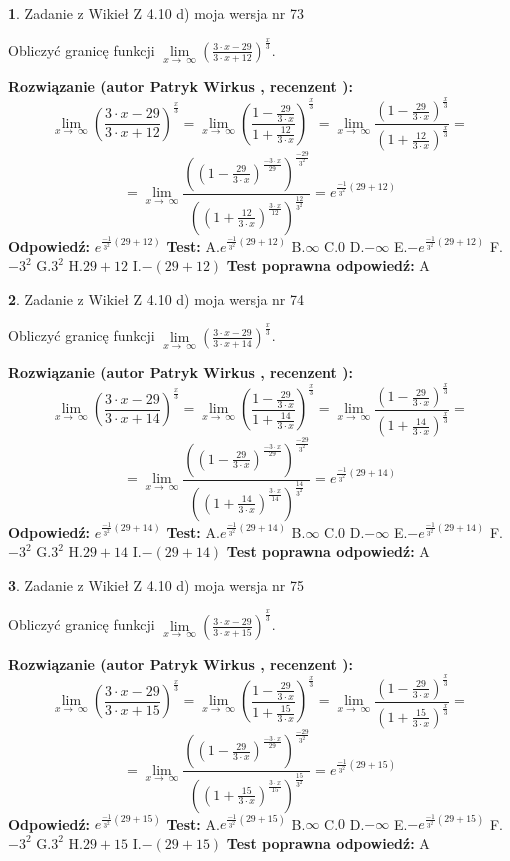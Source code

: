 \documentclass[12pt, a4paper]{article}
\theoremstyle{definition} %
\newtheorem{zad}{}
\newcommand{\zadStart}[1]{\begin{zad}#1\newline}
\newcommand{\zadStop}{\end{zad}}
\newcommand{\rozwStart}[2]{\noindent \textbf{Rozwiązanie (autor #1 , recenzent #2): }\newline}
\newcommand{\rozwStop}{\newline}
\newcommand{\odpStart}{\noindent \textbf{Odpowiedź:}\newline}
\newcommand{\odpStop}{\newline}
\newcommand{\testStart}{\noindent \textbf{Test:}\newline}
\newcommand{\testStop}{\newline}
\newcommand{\kluczStart}{\noindent \textbf{Test poprawna odpowiedź:}\newline}
\newcommand{\kluczStop}{\newline}
\begin{document}
\zadStart{Zadanie z Wikieł Z 4.10 d) moja wersja nr 73}


Obliczyć granicę funkcji  $\lim\limits_{x\to\ \infty}(\frac{3\cdot x-29}{3\cdot x+12})^{\frac{x}{3}}$.
\zadStop
\rozwStart{Patryk Wirkus}{}
$$\lim\limits_{x\to\ \infty}(\frac{3\cdot x-29}{3\cdot x+12})^{\frac{x}{3}} = \lim\limits_{x\to\ \infty}(\frac{1-\frac{29}{3\cdot x}}{1+\frac{12}{3\cdot x}})^{\frac{x}{3}}=\lim\limits_{x\to\ \infty}\frac{(1-\frac{29}{3\cdot x})^{\frac{x}{3}}}{(1+\frac{12}{3\cdot x})^{\frac{x}{3}}}=$$
$$=\lim\limits_{x\to\ \infty}\frac{((1-\frac{29}{3\cdot x})^{\frac{-3\cdot x}{29}})^{\frac{-29}{3^{2}}}}{((1+\frac{12}{3\cdot x})^{\frac{3\cdot x}{12}})^{\frac{12}{3^{2}}}}=e^{\frac{-1}{3^{2}}(29+12)}$$
\rozwStop
\odpStart
$e^{\frac{-1}{3^{2}}(29+12)}$
\odpStop
\testStart
A.$e^{\frac{-1}{3^{2}}(29+12)}$ B.$\infty$ C.$0$ D.$-\infty$ E.$-e^{\frac{-1}{3^{2}}(29+12)}$
F.$-3^{2}$ G.$3^{2}$
H.$29+12$
I.$-(29+12)$
\testStop
\kluczStart
A
\kluczStop



\zadStart{Zadanie z Wikieł Z 4.10 d) moja wersja nr 74}


Obliczyć granicę funkcji  $\lim\limits_{x\to\ \infty}(\frac{3\cdot x-29}{3\cdot x+14})^{\frac{x}{3}}$.
\zadStop
\rozwStart{Patryk Wirkus}{}
$$\lim\limits_{x\to\ \infty}(\frac{3\cdot x-29}{3\cdot x+14})^{\frac{x}{3}} = \lim\limits_{x\to\ \infty}(\frac{1-\frac{29}{3\cdot x}}{1+\frac{14}{3\cdot x}})^{\frac{x}{3}}=\lim\limits_{x\to\ \infty}\frac{(1-\frac{29}{3\cdot x})^{\frac{x}{3}}}{(1+\frac{14}{3\cdot x})^{\frac{x}{3}}}=$$
$$=\lim\limits_{x\to\ \infty}\frac{((1-\frac{29}{3\cdot x})^{\frac{-3\cdot x}{29}})^{\frac{-29}{3^{2}}}}{((1+\frac{14}{3\cdot x})^{\frac{3\cdot x}{14}})^{\frac{14}{3^{2}}}}=e^{\frac{-1}{3^{2}}(29+14)}$$
\rozwStop
\odpStart
$e^{\frac{-1}{3^{2}}(29+14)}$
\odpStop
\testStart
A.$e^{\frac{-1}{3^{2}}(29+14)}$ B.$\infty$ C.$0$ D.$-\infty$ E.$-e^{\frac{-1}{3^{2}}(29+14)}$
F.$-3^{2}$ G.$3^{2}$
H.$29+14$
I.$-(29+14)$
\testStop
\kluczStart
A
\kluczStop



\zadStart{Zadanie z Wikieł Z 4.10 d) moja wersja nr 75}


Obliczyć granicę funkcji  $\lim\limits_{x\to\ \infty}(\frac{3\cdot x-29}{3\cdot x+15})^{\frac{x}{3}}$.
\zadStop
\rozwStart{Patryk Wirkus}{}
$$\lim\limits_{x\to\ \infty}(\frac{3\cdot x-29}{3\cdot x+15})^{\frac{x}{3}} = \lim\limits_{x\to\ \infty}(\frac{1-\frac{29}{3\cdot x}}{1+\frac{15}{3\cdot x}})^{\frac{x}{3}}=\lim\limits_{x\to\ \infty}\frac{(1-\frac{29}{3\cdot x})^{\frac{x}{3}}}{(1+\frac{15}{3\cdot x})^{\frac{x}{3}}}=$$
$$=\lim\limits_{x\to\ \infty}\frac{((1-\frac{29}{3\cdot x})^{\frac{-3\cdot x}{29}})^{\frac{-29}{3^{2}}}}{((1+\frac{15}{3\cdot x})^{\frac{3\cdot x}{15}})^{\frac{15}{3^{2}}}}=e^{\frac{-1}{3^{2}}(29+15)}$$
\rozwStop
\odpStart
$e^{\frac{-1}{3^{2}}(29+15)}$
\odpStop
\testStart
A.$e^{\frac{-1}{3^{2}}(29+15)}$ B.$\infty$ C.$0$ D.$-\infty$ E.$-e^{\frac{-1}{3^{2}}(29+15)}$
F.$-3^{2}$ G.$3^{2}$
H.$29+15$
I.$-(29+15)$
\testStop
\kluczStart
A
\kluczStop
\end{document}
